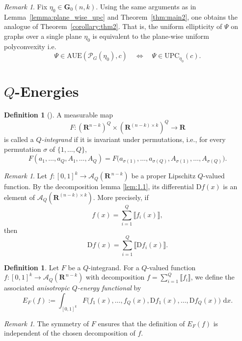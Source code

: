 \documentclass[a4paper,twoside,reqno]{article}
\theoremstyle{definition}
\theoremstyle{remark}
\theoremstyle{plain}
\theoremstyle{remark}
\newtheorem{remark}[theorem]{Remark}
\theoremstyle{definition}
\newtheorem{definition}[theorem]{Definition}
\newcommand{\ograss}[2]{\mathbf{G}_0(#1,#2)}
\newcommand{\UPC}{\mathrm{UPC}}
\newcommand{\AUE}{\mathrm{AUE}}
\newcommand{\R}{\mathbf{R}}
\newcommand{\ud}{\ensuremath{\,\mathrm{d}}}
\newcommand{\uD}{\ensuremath{\mathrm{D}}}
\newcommand{\qspace}[1]{\mathcal{A}_{{#1}}}
\begin{document}
\begin{remark}\label{rem:plane_wise_equivalence}
    Fix $\eta_0 \in \ograss{n}{k}$. Using the same arguments as in 
    Lemma~\ref{lemma:plane_wise_upc} and Theorem~\ref{thm:main2}, one obtains 
    the analogue of Theorem~\ref{corollary:thm2}. That is, the 
    uniform ellipticity of $\Psi$ on graphs over a single plane $\eta_0$ is 
    equivalent to the plane-wise uniform polyconvexity i.e.
    \[
        \Psi \in \AUE(\mathcal{P}_G(\eta_0), c)
        \quad \Longleftrightarrow \quad
        \Psi \in \UPC_{\eta_0}(c).
    \]
\end{remark}

\section{$Q$-Energies}\label{section:q_energies}

\begin{definition}[]
A measurable map
\[
    F \colon (\R^{n-k})^Q \times (\R^{(n-k)\times k})^Q \to \R
\]
is called a \emph{$Q$-integrand} if it is invariant under permutations, i.e.,
for every permutation $\sigma$ of $\{1,\ldots,Q\}$,
\[
    F(a_1,\ldots,a_Q, A_1,\ldots,A_Q)
    =
    F\bigl(a_{\sigma(1)},\ldots,a_{\sigma(Q)},
           A_{\sigma(1)},\ldots,A_{\sigma(Q)}\bigr).
\]
\end{definition}

\begin{remark}
Let
    $f \colon [0,1]^k \to \qspace{Q}(\R^{\,n-k})$ be a proper 
    Lipschitz $Q$-valued function. By the decomposition lemma \ref{lem:1.1}, 
    its differential $\uD f(x)$ is an element of $\qspace{Q}(\R^{(n-k)\times k})$.
    More precisely, if
    \[
        f(x) = \sum_{i=1}^Q \llbracket f_i(x) \rrbracket,
    \]
    then
    \[
        \uD f(x) = \sum_{i=1}^Q \llbracket \uD f_i(x) \rrbracket.
    \]
\end{remark}

\begin{definition}
    Let $F$ be a $Q$-integrand. For a $Q$-valued function
    $f \colon [0,1]^k \to \qspace{Q}(\R^{\,n-k})$ with decomposition
    $f = \sum_{i=1}^Q \llbracket f_i \rrbracket$,
    we define the associated \emph{anisotropic $Q$-energy functional} by
    \[
        E_F(f)
        :=
        \int_{[0,1]^k}
        F\bigl(f_1(x),\ldots,f_Q(x),
        \uD f_1(x),\ldots,\uD f_Q(x)\bigr)\,\ud x.
    \]
\end{definition}

\begin{remark}
    The symmetry of $F$ ensures that the definition of $E_F(f)$ is independent 
    of the chosen decomposition of $f$.
\end{remark}
\end{document}
